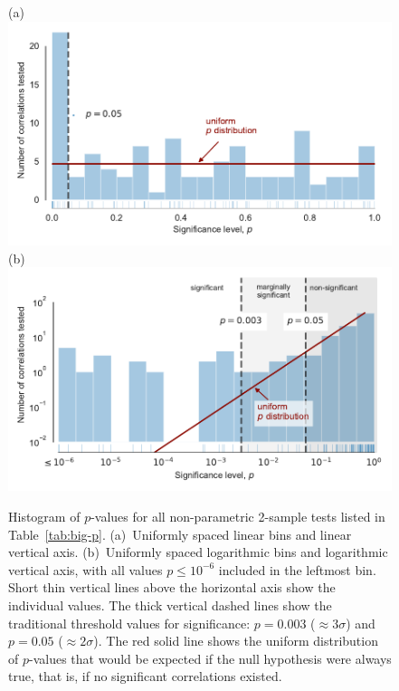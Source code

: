 \documentclass[useAMS, usenatbib, a4paper]{mnras}
\begin{document}
\begin{figure}
  (a)\\
  \includegraphics[width=\linewidth]{figs/p-value-histogram-new-linear}\\
  (b)\\
  \includegraphics[width=\linewidth]{figs/p-value-histogram-new}
  \caption{Histogram of \(p\)-values for all non-parametric 2-sample
    tests listed in Table~\ref{tab:big-p}. (a)~Uniformly spaced linear
    bins and linear vertical axis. (b)~Uniformly spaced logarithmic
    bins and logarithmic vertical axis, with all values
    \(p \le 10^{-6}\) included in the leftmost bin.  Short thin vertical
    lines above the horizontal axis show the individual values.  The
    thick vertical dashed lines show the traditional threshold values
    for significance: \(p = 0.003\) (\(\approx 3 \sigma\)) and
    \(p = 0.05\) (\(\approx 2 \sigma\)). The red solid line shows the uniform
    distribution of \(p\)-values that would be expected if the null
    hypothesis were always true, that is, if no significant
    correlations existed.}
  \label{fig:histo-p-values}
\end{figure}
\end{document}
